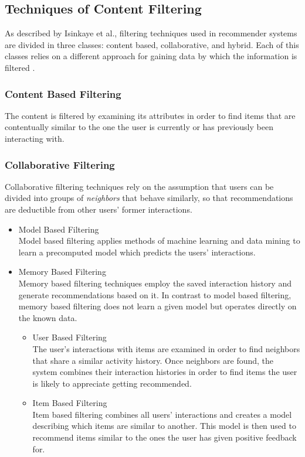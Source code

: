 \newpage
\subsection{Techniques of Content Filtering}
As described by Isinkaye et al., filtering techniques used in recommender systems are divided in three classes: content based, collaborative, and hybrid. Each of this classes relies on a different approach for gaining data by which the information is filtered \cite{Isinkaye2015261}.

\subsubsection{Content Based Filtering}
	The content is filtered by examining its attributes in order to find items that are contentually similar to the one the user is currently or has previously been interacting with.
\subsubsection{Collaborative Filtering}
	Collaborative filtering techniques rely on the assumption that users can be divided into groups of \textit{neighbors} that behave similarly, so that recommendations are deductible from other users' former interactions.
	\begin{itemize}
		\item Model Based Filtering\\
		Model based filtering applies methods of machine learning and data mining to learn a precomputed model which predicts the users' interactions.
		\item Memory Based Filtering\\
		Memory based filtering techniques employ the saved interaction history and generate recommendations based on it. In contrast to model based filtering, memory based filtering does not learn a given model but operates directly on the known data.
		\begin{itemize}
			\item User Based Filtering\\
			The user's interactions with items are examined in order to find neighbors that share a similar activity history. Once neighbors are found, the system combines their interaction histories in order to find items the user is likely to appreciate getting recommended.
			\item Item Based Filtering\\
			Item based filtering combines all users' interactions and creates a model describing which items are similar to another. This model is then used to recommend items similar to the ones the user has given positive feedback for.
		\end{itemize}
	\end{itemize}
